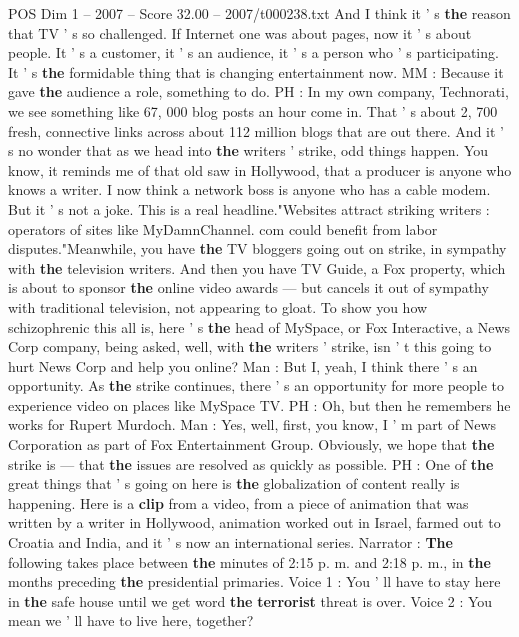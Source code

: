 \begin{textsample}{POS Dim 1 – 2007 – Score 32.00 – 2007/t000238.txt}
And I think it ' s \textbf{the} reason that TV ' s so challenged.
If Internet one was about pages, now it ' s about people.
It ' s a customer, it ' s an audience, it ' s a person who ' s participating.
It ' s \textbf{the} formidable thing that is changing entertainment now.
MM : Because it gave \textbf{the} audience a role, something to do.
PH : In my own company, Technorati, we see something like 67, 000 blog posts an hour come in.
That ' s about 2, 700 fresh, connective links across about 112 million blogs that are out there.
And it ' s no wonder that as we head into \textbf{the} writers ' strike, odd things happen.
You know, it reminds me of that old saw in Hollywood, that a producer is anyone who knows a writer.
I now think a network boss is anyone who has a cable modem.
But it ' s not a joke.
This is a real headline."Websites attract striking writers : operators of sites like MyDamnChannel. com could benefit from labor disputes."Meanwhile, you have \textbf{the} TV bloggers going out on strike, in sympathy with \textbf{the} television writers.
And then you have TV Guide, a Fox property, which is about to sponsor \textbf{the} online video awards — but cancels it out of sympathy with traditional television, not appearing to gloat.
To show you how schizophrenic this all is, here ' s \textbf{the} head of MySpace, or Fox Interactive, a News Corp company, being asked, well, with \textbf{the} writers ' strike, isn ' t this going to hurt News Corp and help you online?
Man : But I, yeah, I think there ' s an opportunity.
As \textbf{the} strike continues, there ' s an opportunity for more people to experience video on places like MySpace TV.
PH : Oh, but then he remembers he works for Rupert Murdoch.
Man : Yes, well, first, you know, I ' m part of News Corporation as part of Fox Entertainment Group.
Obviously, we hope that \textbf{the} strike is — that \textbf{the} issues are resolved as quickly as possible.
PH : One of \textbf{the} great things that ' s going on here is \textbf{the} globalization of content really is happening.
Here is a \textbf{clip} from a video, from a piece of animation that was written by a writer in Hollywood, animation worked out in Israel, farmed out to Croatia and India, and it ' s now an international series.
Narrator : \textbf{The} following takes place between \textbf{the} minutes of 2:15 p. m. and 2:18 p. m., in \textbf{the} months preceding \textbf{the} presidential primaries.
Voice 1 : You ' ll have to stay here in \textbf{the} safe house until we get word \textbf{the} \textbf{terrorist} threat is over.
Voice 2 : You mean we ' ll have to live here, together?

\end{textsample}
